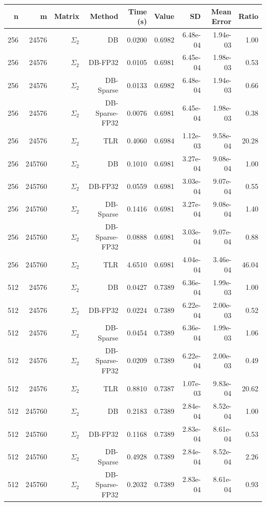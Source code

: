 \begin{tabular}{|r|r|r|r|r|r|r|r|r|}
  \hline
  \textbf{n} & \textbf{m} & \textbf{Matrix} & \textbf{Method} & \textbf{Time (s)} & \textbf{Value} & \textbf{SD} & \textbf{Mean Error} & \textbf{Ratio} \\
  \hline
  256 & 24576 & $\Sigma_2$ & DB & 0.0200 & 0.6982 & 6.48e-04 & 1.94e-03 & 1.00 \\
  256 & 24576 & $\Sigma_2$ & DB-FP32 & 0.0105 & 0.6981 & 6.45e-04 & 1.98e-03 & 0.53 \\
  256 & 24576 & $\Sigma_2$ & DB-Sparse & 0.0133 & 0.6982 & 6.48e-04 & 1.94e-03 & 0.66 \\
  256 & 24576 & $\Sigma_2$ & DB-Sparse-FP32 & 0.0076 & 0.6981 & 6.45e-04 & 1.98e-03 & 0.38 \\
  256 & 24576 & $\Sigma_2$ & TLR & 0.4060 & 0.6984 & 1.12e-03 & 9.58e-04 & 20.28 \\
  256 & 245760 & $\Sigma_2$ & DB & 0.1010 & 0.6981 & 3.27e-04 & 9.08e-04 & 1.00 \\
  256 & 245760 & $\Sigma_2$ & DB-FP32 & 0.0559 & 0.6981 & 3.03e-04 & 9.07e-04 & 0.55 \\
  256 & 245760 & $\Sigma_2$ & DB-Sparse & 0.1416 & 0.6981 & 3.27e-04 & 9.08e-04 & 1.40 \\
  256 & 245760 & $\Sigma_2$ & DB-Sparse-FP32 & 0.0888 & 0.6981 & 3.03e-04 & 9.07e-04 & 0.88 \\
  256 & 245760 & $\Sigma_2$ & TLR & 4.6510 & 0.6981 & 4.04e-04 & 3.46e-04 & 46.04 \\
  512 & 24576 & $\Sigma_2$ & DB & 0.0427 & 0.7389 & 6.36e-04 & 1.99e-03 & 1.00 \\
  512 & 24576 & $\Sigma_2$ & DB-FP32 & 0.0224 & 0.7389 & 6.22e-04 & 2.00e-03 & 0.52 \\
  512 & 24576 & $\Sigma_2$ & DB-Sparse & 0.0454 & 0.7389 & 6.36e-04 & 1.99e-03 & 1.06 \\
  512 & 24576 & $\Sigma_2$ & DB-Sparse-FP32 & 0.0209 & 0.7389 & 6.22e-04 & 2.00e-03 & 0.49 \\
  512 & 24576 & $\Sigma_2$ & TLR & 0.8810 & 0.7387 & 1.07e-03 & 9.83e-04 & 20.62 \\
  512 & 245760 & $\Sigma_2$ & DB & 0.2183 & 0.7389 & 2.84e-04 & 8.52e-04 & 1.00 \\
  512 & 245760 & $\Sigma_2$ & DB-FP32 & 0.1168 & 0.7389 & 2.83e-04 & 8.61e-04 & 0.53 \\
  512 & 245760 & $\Sigma_2$ & DB-Sparse & 0.4928 & 0.7389 & 2.84e-04 & 8.52e-04 & 2.26 \\
  512 & 245760 & $\Sigma_2$ & DB-Sparse-FP32 & 0.2032 & 0.7389 & 2.83e-04 & 8.61e-04 & 0.93 \\

\end{tabular}
